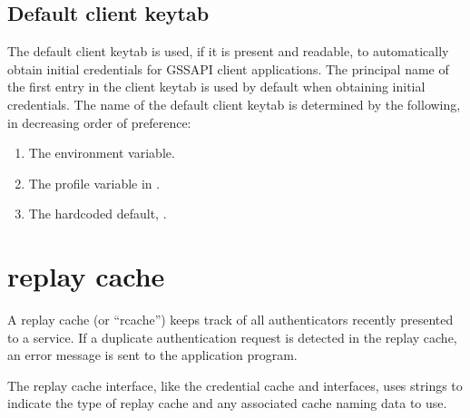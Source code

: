 \documentclass[letterpaper,10pt,english]{sphinxmanual}
\begin{document}
\section{Default client keytab}
\label{\detokenize{basic/keytab_def:default-client-keytab}}
The default client keytab is used, if it is present and readable, to
automatically obtain initial credentials for GSSAPI client
applications.  The principal name of the first entry in the client
keytab is used by default when obtaining initial credentials.  The
name of the default client keytab is determined by the following, in
decreasing order of preference:
\begin{enumerate}
\item {} 
The  environment variable.

\item {} 
The  profile variable in
.

\item {} 
The hardcoded default, .

\end{enumerate}


\chapter{replay cache}
\label{\detokenize{basic/rcache_def:replay-cache}}\label{\detokenize{basic/rcache_def:rcache-definition}}\label{\detokenize{basic/rcache_def::doc}}
A replay cache (or “rcache”) keeps track of all authenticators
recently presented to a service.  If a duplicate authentication
request is detected in the replay cache, an error message is sent to
the application program.

The replay cache interface, like the credential cache and
{\hyperref[\detokenize{basic/keytab_def:keytab-definition}]{}} interfaces, uses  strings to
indicate the type of replay cache and any associated cache naming
data to use.
\end{document}
